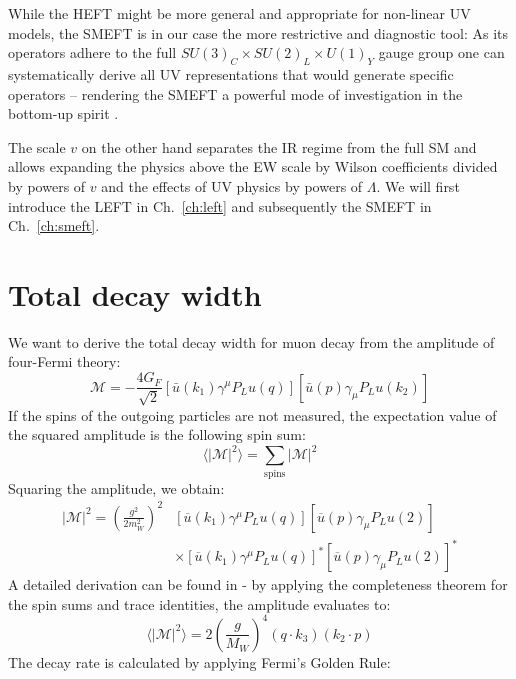 While the HEFT might be more general and appropriate for non-linear UV models, the SMEFT is in our case the more restrictive and diagnostic tool: As its operators adhere to the full $SU(3)_C\times SU(2)_L\times U(1)_Y$ gauge group one can systematically derive all UV representations that would generate specific operators -- rendering the SMEFT a powerful mode of investigation in the bottom-up spirit \cite{li2022bottom}.\par 
The scale $v$ on the other hand separates the IR regime from the full SM and allows expanding the physics above the EW scale by Wilson coefficients divided by powers of $v$ and the effects of UV physics by powers of $\Lambda$. We will first introduce the LEFT in Ch.~\ref{ch:left} and subsequently the SMEFT in Ch.~\ref{ch:smeft}.
\section{Total decay width}
We want to derive the total decay width for muon decay from the amplitude of four-Fermi theory:
\begin{equation}
    \mathcal{M}=-\frac{4G_F}{\sqrt{2}}[\bar u(k_1)\gamma^\mu P_L u(q)][\bar u(p)\gamma_\mu P_L u(k_2)]
    \label{eq:Amp4F2}
\end{equation}
If the spins of the outgoing particles are not measured, the expectation value of the squared amplitude is the following spin sum:
\begin{equation}
    \langle|\mathcal{M}|^2\rangle=\sum_{\text{spins}}|\mathcal{M}|^2
\end{equation}
Squaring the amplitude, we obtain:
\begin{equation}
\begin{aligned}
    |\mathcal{M}|^2=\left(\frac{g^2}{2m_W^2}\right)^2&[\overline{u}(k_1)\gamma^\mu P_L u(q)][\overline{u}(p)\gamma_\mu P_Lu(2)]\\ &\times [\overline{u}(k_1)\gamma^\mu P_L u(q)]^*[\overline{u}(p)\gamma_\mu P_Lu(2)]^*
    \label{eq:T2}
\end{aligned}
\end{equation}
A detailed derivation can be found in \cite{griffiths2020introduction} - by applying the completeness theorem for the spin sums and trace identities, the amplitude evaluates to:
\begin{equation}
    \langle|\mathcal{M}|^2\rangle=2\left(\frac{g}{M_W}\right)^4(q\cdot k_3)(k_2\cdot p)
    \label{eq:T2summedF}
\end{equation}
The decay rate is calculated by applying Fermi's Golden Rule:
